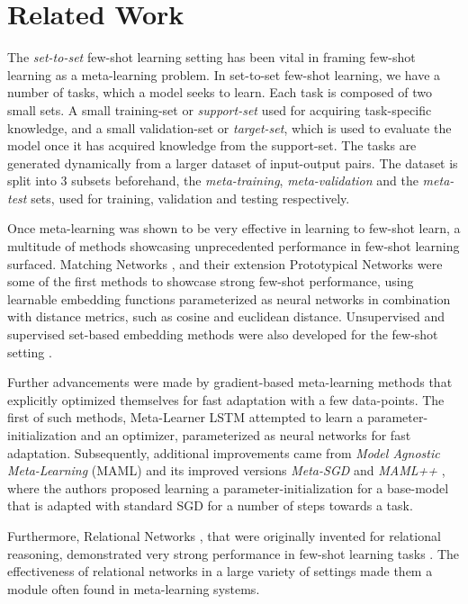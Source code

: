\documentclass{article} \usepackage[dvipsnames]{xcolor}
\begin{document}
\section{Related Work}
The \emph{set-to-set} few-shot learning setting \citep{vinyals2016matching} has been vital in framing few-shot learning as a meta-learning problem. In set-to-set few-shot learning, we have a number of tasks, which a model seeks to learn. Each task is composed of two small sets. A small training-set or \emph{support-set} used for acquiring task-specific knowledge, and a small validation-set or \emph{target-set}, which is used to evaluate the model once it has acquired knowledge from the support-set. The tasks are generated dynamically from a larger dataset of input-output pairs. The dataset is split into 3 subsets beforehand, the \emph{meta-training}, \emph{meta-validation} and the \emph{meta-test} sets, used for training, validation and testing respectively.

Once meta-learning was shown to be very effective in learning to few-shot learn, a multitude of methods showcasing unprecedented performance in few-shot learning surfaced. Matching Networks \citep{vinyals2016matching}, and their extension Prototypical Networks \citep{snell2017prototypical} were some of the first methods to showcase strong few-shot performance, using learnable embedding functions parameterized as neural networks in combination with distance metrics, such as cosine and euclidean distance. Unsupervised and supervised set-based embedding methods were also developed for the few-shot setting \citep{edwards2016towards}.

Further advancements were made by gradient-based meta-learning methods that explicitly optimized themselves for fast adaptation with a few data-points. The first of such methods, Meta-Learner LSTM \citep{ravi2016optimization} attempted to learn a parameter-initialization and an optimizer, parameterized as neural networks for fast adaptation. Subsequently, additional improvements came from \emph{Model Agnostic Meta-Learning} (MAML) \citep{finn2017model} and its improved versions \emph{Meta-SGD} \citep{li2017meta} and \emph{MAML++} \citep{antoniou2018train}, where the authors proposed learning a parameter-initialization for a base-model that is adapted with standard SGD for a number of steps towards a task. 

Furthermore, Relational Networks \citep{santoro2017simple}, that were originally invented for relational reasoning, demonstrated very strong performance in few-shot learning tasks \citep{santurkar2018does}. The effectiveness of relational networks in a large variety of settings made them a module often found in meta-learning systems.
\end{document}
